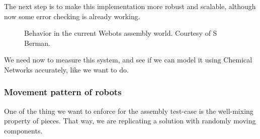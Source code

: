 \documentclass[letterpaper, oneside]{article}
\begin{document}
The next step is to make this implementation more robust and scalable, although now some error checking is already working.

\begin{figure}[h]
	\; %
	\; %
	\; %
	\caption{Behavior in the current Webots assembly world. Courtesy of S Berman.}
\label{fig:behavior_webots_assembly} %
\end{figure}

We need now to measure this system, and see if we can model it using Chemical Networks accurately, like we want to do.

\subsubsection{Movement pattern of robots} %
\label{ssub:movement_pattern_of_robots}
One of the thing we want to enforce for the assembly test-case is the well-mixing property of pieces. That way, we are replicating a solution with randomly moving components.
\end{document}
